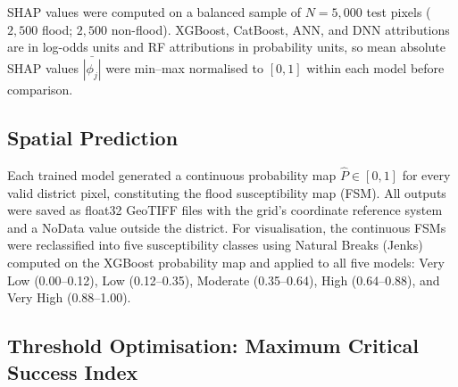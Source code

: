 \documentclass[12pt, a4paper]{article}
\begin{document}
SHAP values were computed on a balanced sample of $N = 5{,}000$ test pixels ($2{,}500$ flood; $2{,}500$ non-flood). XGBoost, CatBoost, ANN, and DNN attributions are in log-odds units and RF attributions in probability units, so mean absolute SHAP values $\bar{|\phi_j|}$ were min--max normalised to $[0,1]$ within each model before comparison.

\subsection{Spatial Prediction}

Each trained model generated a continuous probability map $\hat{P} \in [0,1]$ for every valid district pixel, constituting the flood susceptibility map (FSM). All outputs were saved as float32 GeoTIFF files with the grid's coordinate reference system and a NoData value outside the district. For visualisation, the continuous FSMs were reclassified into five susceptibility classes using Natural Breaks (Jenks) computed on the XGBoost probability map and applied to all five models: Very Low (0.00--0.12), Low (0.12--0.35), Moderate (0.35--0.64), High (0.64--0.88), and Very High (0.88--1.00).

\subsection{Threshold Optimisation: Maximum Critical Success Index}
\end{document}
